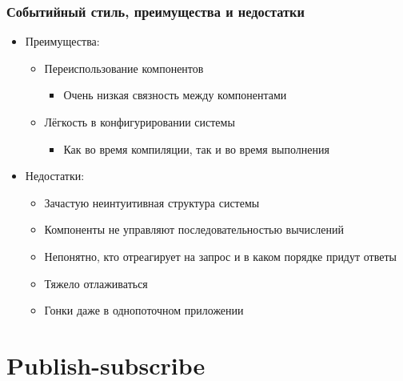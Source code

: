 \documentclass{../../slides-style}
\begin{document}
    \begin{frame}
        \frametitle{Событийный стиль, преимущества и недостатки}
        \begin{itemize}
            \item Преимущества:
            \begin{itemize}
                \item Переиспользование компонентов
                \begin{itemize}
                    \item Очень низкая связность между компонентами
                \end{itemize}
                \item Лёгкость в конфигурировании системы
                \begin{itemize}
                    \item Как во время компиляции, так и во время выполнения
                \end{itemize}
            \end{itemize}
            \item Недостатки:
            \begin{itemize}
                \item Зачастую неинтуитивная структура системы
                \item Компоненты не управляют последовательностью вычислений
                \item Непонятно, кто отреагирует на запрос и в каком порядке придут ответы
                \item Тяжело отлаживаться
                \item Гонки даже в однопоточном приложении
            \end{itemize}
        \end{itemize}
    \end{frame}

    \section{Publish-subscribe}
\end{document}
